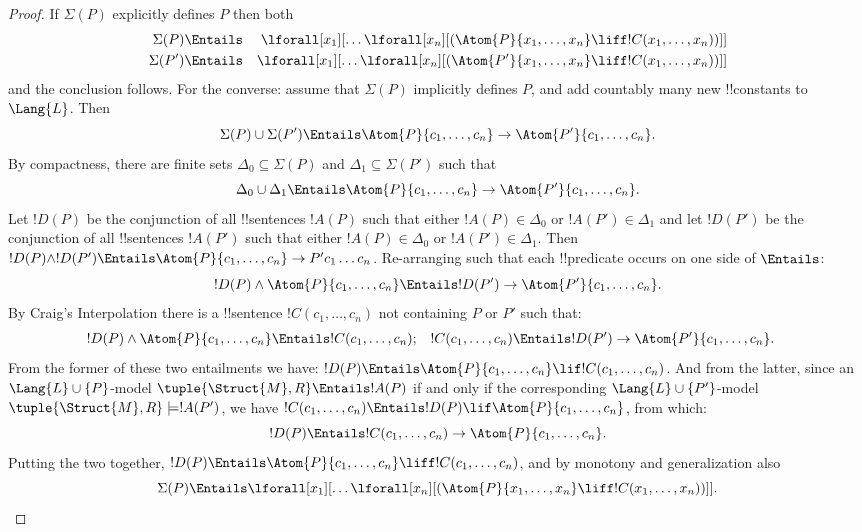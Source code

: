 \documentclass[../../include/open-logic-section]{subfiles}
\begin{document}
\begin{proof}
If $\Sigma(P)$ explicitly defines $P$ then both
\begin{align*}
  \Sigma(P) & \Entails & \lforall[x_1][\dots \lforall[x_n]
    [(\Atom{P}{x_1,\dots, x_n} \liff !C(x_1,\dots,x_n))]]\\
  \Sigma(P') & \Entails & \lforall[x_1][\dots \lforall[x_n]
    [(\Atom{P'}{x_1,\dots, x_n} \liff !C(x_1,\dots,x_n))]]
\end{align*}
and the conclusion follows. For the converse: assume that $\Sigma(P)$
implicitly defines $P$, and add countably many new !!{constant}s to
$\Lang{L}$. Then
\[
\Sigma(P) \cup \Sigma(P') \Entails \Atom{P}{c_1, \dots, c_n} \to  \Atom{P'}{c_1, \dots, c_n}.
\]
By compactness, there are finite sets $\Delta_0 \subseteq \Sigma(P)$
and $\Delta_1 \subseteq \Sigma(P')$ such that
\[
\Delta_0 \cup \Delta_1 \Entails \Atom{P}{c_1, \dots, c_n} \to \Atom{P'}{c_1, \dots, c_n}.
\]
Let $!D(P)$ be the conjunction of all !!{sentence}s $!A(P)$ such
that either $!A(P) \in \Delta_0$ or $!A(P') \in \Delta_1$ and let
$!D(P')$ be the conjunction of all !!{sentence}s $!A(P')$ such
that either $!A(P) \in \Delta_0$ or $!A(P') \in \Delta_1$. Then
$!D(P) \land !D(P') \Entails \Atom{P}{c_1, \dots, c_n} \to P'c_1\dots
c_n$. Re-arranging such that each !!{predicate} occurs on one side of
$\Entails$:
\[
!D(P) \land \Atom{P}{c_1, \dots, c_n} \Entails !D(P') \to \Atom{P'}{c_1, \dots, c_n}.
\]
By Craig's Interpolation there is a !!{sentence} $!C(c_1,\dots, c_n)$
not containing $P$ or $P'$ such that:
\begin{align*}
  !D(P) \land \Atom{P}{c_1, \dots, c_n} & \Entails !C(c_1,\dots, c_n); &
  !C(c_1,\dots, c_n) & \Entails !D(P') \to \Atom{P'}{c_1, \dots, c_n}.
\end{align*}
From the former of these two entailments we have: $!D(P) \Entails
\Atom{P}{c_1,\dots, c_n} \lif !C(c_1,\dots, c_n)$. And from the
latter, since an $\Lang{L} \cup \{P\}$-model $\tuple{\Struct{M}, R}
\Entails !A(P)$ if and only if the corresponding $\Lang{L} \cup
\{P'\}$-model $\tuple{\Struct{M}, R} \models !A(P')$, we have
$!C(c_1,\dots, c_n) \Entails !D(P) \lif \Atom{P}{c_1,\dots, c_n}$,
from which:
\[
!D(P) \Entails !C(c_1,\dots,c_n) \to \Atom{P}{c_1,\dots, c_n}.
\]
Putting the two together, $!D(P) \Entails \Atom{P}{c_1,\dots, c_n}
\liff !C(c_1, \dots, c_n)$, and by monotony and generalization also
\[
\Sigma(P) \Entails
\lforall[x_1][\dots\lforall[x_n][(\Atom{P}{x_1,\dots, x_n} \liff
    !C(x_1,\dots, x_n))]].\qedhere
\]

\end{proof}
\end{document}
